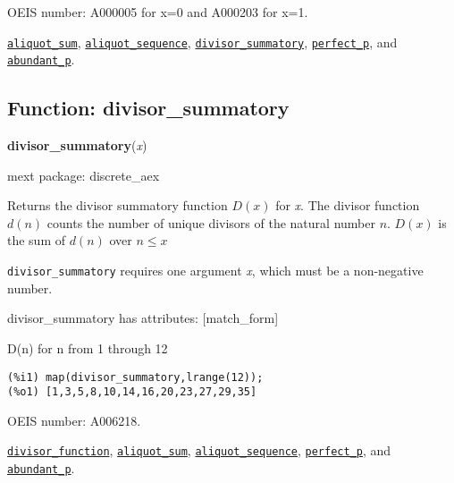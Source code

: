 \documentclass[]{article}
\begin{document}
\vspace{5 pt}


OEIS number: A000005 for x=0 and A000203 for x=1.


  \hyperlink{aliquot_sum}{{\tt aliquot\_sum}}, \hyperlink{aliquot_sequence}{{\tt aliquot\_sequence}}, \hyperlink{divisor_summatory}{{\tt divisor\_summatory}}, \hyperlink{perfect_p}{{\tt perfect\_p}}, and \hyperlink{abundant_p}{{\tt abundant\_p}}.

\vspace{5 pt}


\subsection{Function: divisor\_summatory\label{sec:divisor_summatory}}
\hypertarget{divisor_summatory}{}
{\bf divisor\_summatory}({\it x})


\noindent mext package: discrete\_aex



\vspace{5 pt}
Returns the divisor summatory function $D(x)$ for {\it x}. The divisor function $d(n)$ counts the number of unique divisors of the natural number $n$. $D(x)$ is the sum of $d(n)$ over $n \le x$ 

\vspace{5 pt}

   {\tt divisor\_summatory} requires one argument {\it x}, which must be a non-negative number.


\vspace{5 pt}

divisor\_summatory has attributes: [match\_form]

\vspace{5 pt}


   D(n) for n from 1 through 12 

\begin{Verbatim}[frame=single]
(%i1) map(divisor_summatory,lrange(12));
(%o1) [1,3,5,8,10,14,16,20,23,27,29,35]
\end{Verbatim}


OEIS number: A006218.


  \hyperlink{divisor_function}{{\tt divisor\_function}}, \hyperlink{aliquot_sum}{{\tt aliquot\_sum}}, \hyperlink{aliquot_sequence}{{\tt aliquot\_sequence}}, \hyperlink{perfect_p}{{\tt perfect\_p}}, and \hyperlink{abundant_p}{{\tt abundant\_p}}.
\end{document}
